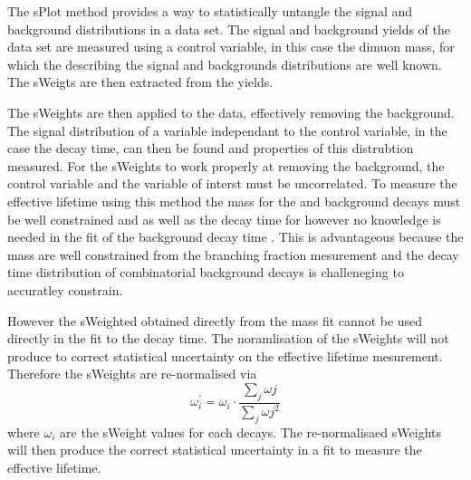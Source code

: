 The sPlot method provides a way to statistically untangle the signal and background distributions in a data set. %
The signal and background yields of the data set are measured using a control variable, in this case the dimuon mass, for which the \pdfs describing the signal and backgrounds distributions are well known. The sWeigts are then extracted from the yields.



The sWeights are then applied to the data, effectively removing the background. The signal distribution of a variable independant to the control variable, in the case the decay time, can then be found and properties of this distrubtion measured. For the sWeights to work properly at removing the background, the control variable and the variable of interst must be uncorrelated.
 To measure the \bsmumu effective lifetime using this method the mass \pdfs for the \bsmumu and background decays must be well constrained and as well as the decay time \pdf for \bsmumu however no knowledge is needed in the fit of the background decay time \pdf. This is advantageous because the mass \pdfs are well constrained from the branching fraction mesurement and the decay time distribution of combinatorial background decays is challeneging to accuratley constrain. 

However the sWeighted obtained directly from the mass fit cannot be used directly in the \ml fit to the decay time. The noramlisation of the sWeights will not produce to correct statistical uncertainty on the effective lifetime mesurement. Therefore the sWeights are re-normalised via
\begin{equation}
\omega^{'}_{i}= \omega_{i} \cdot \frac{\displaystyle\sum_{j} \omega{j}}{\displaystyle\sum_{j} \omega{j}^{2}}
\end{equation}
where $\omega_{i}$ are the sWeight values for each decays. The re-normalisaed sWeights will then produce the correct statistical uncertainty in a \ml fit to measure the \bsmumu effective lifetime.

